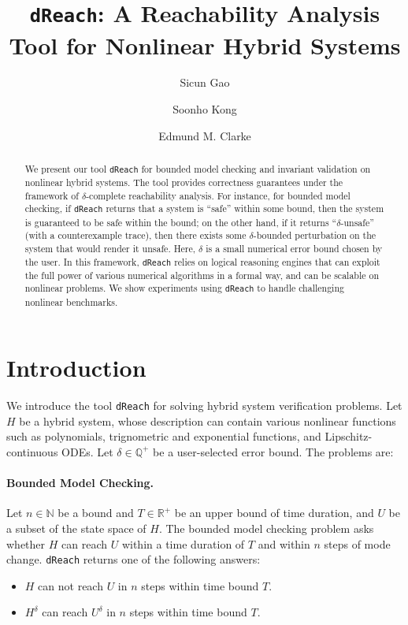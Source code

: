 \documentclass[envcountsect]{llncs}
\title{{\tt dReach}: A Reachability Analysis Tool for Nonlinear Hybrid Systems}
\author{Sicun Gao \and Soonho Kong \and Edmund M. Clarke}
\institute{Carnegie Mellon University, Pittsburgh, PA 15213}
\begin{document}
\maketitle

\begin{abstract}
We present our tool {\tt dReach} for bounded model checking
and invariant validation on nonlinear hybrid systems. The tool provides
correctness guarantees under the framework of $\delta$-complete reachability
analysis. For instance, for bounded model checking, if {\tt dReach} returns that
a system is ``safe'' within some bound, then the system is guaranteed to be safe
within the bound; on the other hand, if it returns ``$\delta$-unsafe'' (with a
counterexample trace), then there exists some $\delta$-bounded perturbation on the
system that would render it unsafe. Here, $\delta$ is a small numerical error
bound chosen by the user. In this framework, {\tt dReach} relies on logical
reasoning engines that can exploit the full power of various numerical
algorithms in a formal way, and can be scalable on nonlinear problems. 
We show experiments using {\tt dReach} to handle challenging nonlinear
benchmarks. 
\end{abstract}

\section{Introduction}

We introduce the tool {\tt dReach} for solving hybrid
system verification problems. Let $H$ be a hybrid system, whose description can
contain various nonlinear functions such as polynomials, trignometric
and exponential functions, and Lipschitz-continuous ODEs. Let $\delta\in
\mathbb{Q}^+$ be a user-selected error bound. The problems are:
\paragraph{Bounded Model Checking.} Let $n\in \mathbb{N}$ be a bound and
$T\in \mathbb{R}^+$ be an upper bound of time duration, and $U$ be a subset of
the state space of $H$. The bounded model checking problem asks whether $H$ can
reach $U$ within a time duration of $T$ and within $n$ steps of mode change.
{\tt dReach} returns one of the following answers:
\begin{itemize}
 \item $H$ can not reach $U$ in $n$ steps within time bound $T$. 
 \item $H^{\delta}$ can reach $U^{\delta}$ in $n$ steps within time bound $T$. 
\end{itemize}
\end{document}

